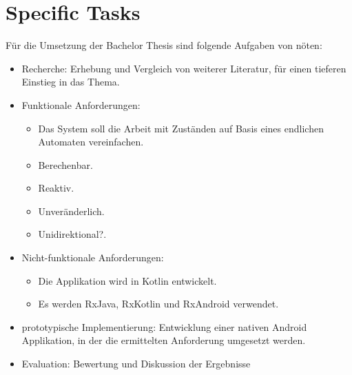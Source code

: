 \section{Specific Tasks}
\label{sec:specific-tasks}

Für die Umsetzung der Bachelor Thesis sind folgende Aufgaben von nöten:
%
\begin{itemize}
    \item Recherche: Erhebung und Vergleich von weiterer Literatur, für einen tieferen Einstieg in das Thema.
    \item Funktionale Anforderungen: 
        \begin{itemize}
            \item Das System soll die Arbeit mit Zuständen auf Basis eines endlichen Automaten vereinfachen.
            \item Berechenbar.
            \item Reaktiv.
            \item Unveränderlich.
            \item Unidirektional?.
        \end{itemize}
    \item Nicht-funktionale Anforderungen:
    \begin{itemize}
        \item Die Applikation wird in Kotlin entwickelt.
        \item Es werden RxJava, RxKotlin und RxAndroid verwendet.
    \end{itemize}
    \item prototypische Implementierung: Entwicklung einer nativen Android Applikation, in der 
    die ermittelten Anforderung umgesetzt werden.
    \item Evaluation: Bewertung und Diskussion der Ergebnisse
\end{itemize}